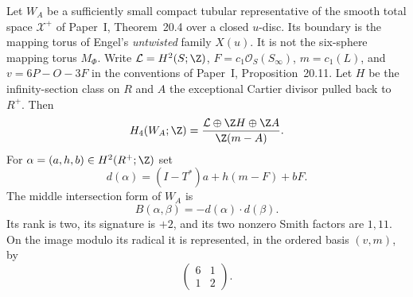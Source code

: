\begin{proposition}\label{push:src:C.2.2}
Let $W_A$ be a sufficiently small compact tubular representative of the
smooth total space $\mathcal X^+$ of Paper~I, Theorem~20.4 over a closed $u$-disc.
Its boundary is the mapping torus of Engel's \emph{untwisted} family
$X(u)$. It is not the six-sphere mapping torus $M_\Phi$.
Write $\mathcal L=H^2(S;\Z)$, $F=c_1\mathcal O_S(S_\infty)$,
$m=c_1(L)$, and $v=6P-O-3F$ in the conventions of Paper~I, Proposition~20.11.
Let $H$ be the infinity-section class on $R$ and $A$ the exceptional
Cartier divisor pulled back to $R^+$. Then
\[
 H_4(W_A;\Z)=
 \frac{\mathcal L\oplus\Z H\oplus\Z A}{\Z(m-A)}.
\]
For $\alpha=(a,h,b)\in H^2(R^+;\Z)$ set
\[
 d(\alpha)=(I-T^*)a+h(m-F)+bF.
\]
The middle intersection form of $W_A$ is
\[
 B(\alpha,\beta)=-d(\alpha)\cdot d(\beta).
\]
Its rank is two, its signature is $+2$, and its two nonzero Smith
factors are $1,11$. On the image modulo its radical it is represented,
in the ordered basis $(v,m)$, by
\[
 \begin{pmatrix}6&1\\1&2\end{pmatrix}.
\]
\end{proposition}
